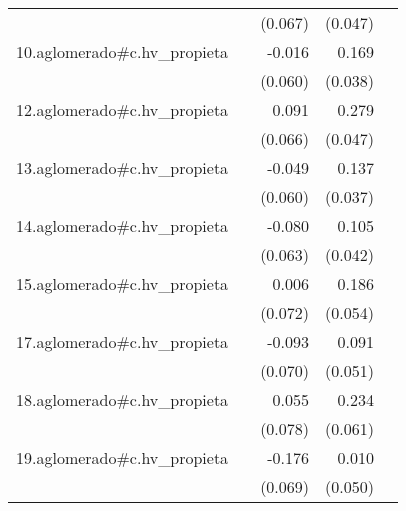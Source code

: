 {\begin{longtable}{l*{4}{D{.}{.}{-1}}}
            &                     &     (0.067)         &     (0.047)         &                     \\
\addlinespace
10.aglomerado#c.hv\_propieta&                     &      -0.016         &       0.169\sym{***}&                     \\
            &                     &     (0.060)         &     (0.038)         &                     \\
\addlinespace
12.aglomerado#c.hv\_propieta&                     &       0.091         &       0.279\sym{***}&                     \\
            &                     &     (0.066)         &     (0.047)         &                     \\
\addlinespace
13.aglomerado#c.hv\_propieta&                     &      -0.049         &       0.137\sym{***}&                     \\
            &                     &     (0.060)         &     (0.037)         &                     \\
\addlinespace
14.aglomerado#c.hv\_propieta&                     &      -0.080         &       0.105\sym{*}  &                     \\
            &                     &     (0.063)         &     (0.042)         &                     \\
\addlinespace
15.aglomerado#c.hv\_propieta&                     &       0.006         &       0.186\sym{***}&                     \\
            &                     &     (0.072)         &     (0.054)         &                     \\
\addlinespace
17.aglomerado#c.hv\_propieta&                     &      -0.093         &       0.091         &                     \\
            &                     &     (0.070)         &     (0.051)         &                     \\
\addlinespace
18.aglomerado#c.hv\_propieta&                     &       0.055         &       0.234\sym{***}&                     \\
            &                     &     (0.078)         &     (0.061)         &                     \\
\addlinespace
19.aglomerado#c.hv\_propieta&                     &      -0.176\sym{*}  &       0.010         &                     \\
            &                     &     (0.069)         &     (0.050)         &                     \\

\end{longtable}}

